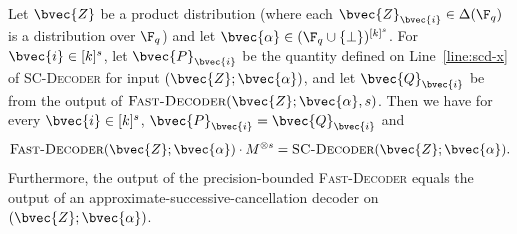 \documentclass[11pt]{article}
\begin{document}
\begin{lemma}
	\label{lem:fast-equivalence}
	Let $\bvec{Z}$ be a product distribution
	(where each $\bvec{Z}_{\bvec{i}} \in \Delta(\F_q)$ is a distribution over
	$\F_q$) and let 
	$\bvec{\alpha} \in (\F_q \cup \{\bot\})^{[k]^s}$.  
For $\bvec{i} \in [k]^s$, let $\bvec{P}_{\bvec{i}}$ be the quantity defined on Line~\ref{line:scd-x} of \textsc{SC-Decoder} for input $(\bvec{Z}; \bvec{\alpha})$, and let $\bvec{Q}_{\bvec{i}}$ be from the output of 
	$\textsc{Fast-Decoder}(\bvec{Z}; \bvec{\alpha},s)$. Then we have for every $\bvec{i} \in [k]^s$, $\bvec{P}_{\bvec{i}} = \bvec{Q}_{\bvec{i}}$ and 
	$$
	\textsc{Fast-Decoder}(\bvec{Z}; \bvec{\alpha}) \cdot M^{\otimes s}
	=
	\textsc{SC-Decoder}(\bvec{Z}; \bvec{\alpha}).
	$$
	Furthermore, the output of the precision-bounded \textsc{Fast-Decoder} equals the output of an approximate-successive-cancellation decoder on $(\bvec{Z}; \bvec{\alpha})$.
	
\end{lemma}
\end{document}
